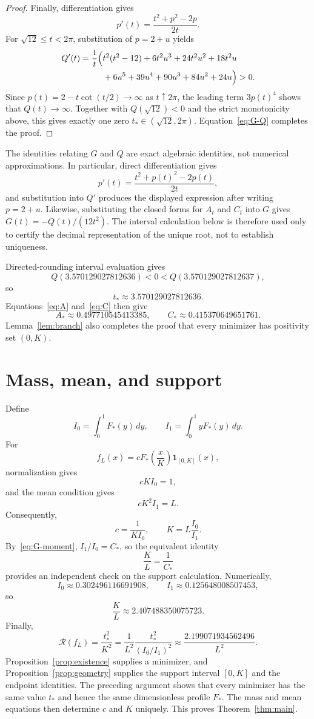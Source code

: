 \documentclass[11pt]{amsart}
\theoremstyle{definition}
\theoremstyle{remark}
\newcommand{\Rcal}{\mathcal R}
\begin{document}
\begin{proof}
Finally, differentiation gives
\[
 p'(t)=\frac{t^2+p^2-2p}{2t}.
\]
For $\sqrt{12}\leq t<2\pi$, substitution of $p=2+u$ yields
\[
 \begin{aligned}
 Q'(t)=\frac{1}{t}\Bigl(&t^2(t^2-12)+6t^2u^3+24t^2u^2+18t^2u\\
 &+6u^5+39u^4+90u^3+84u^2+24u\Bigr)>0.
 \end{aligned}
\]
Since $p(t)=2-t\cot(t/2)\to\infty$ as $t\uparrow2\pi$, the leading term
$3p(t)^4$ shows that $Q(t)\to\infty$. Together with
$Q(\sqrt{12})<0$ and the strict monotonicity above, this gives exactly one
zero $t_*\in(\sqrt{12},2\pi)$. Equation~\eqref{eq:G-Q} completes the proof.
\end{proof}

The identities relating $G$ and $Q$ are exact algebraic identities, not numerical approximations. In particular, direct differentiation gives
\[
 p'(t)=\frac{t^2+p(t)^2-2p(t)}{2t},
\]
and substitution into $Q'$ produces the displayed expression after writing $p=2+u$. Likewise, substituting the closed forms for $A_t$ and $C_t$ into $G$ gives $G(t)=-Q(t)/(12t^2)$. The interval calculation below is therefore used only to certify the decimal representation of the unique root, not to establish uniqueness.

Directed-rounding interval evaluation gives
\[
 Q(3.570129027812636)<0
 <Q(3.570129027812637),
\]
so
\[
 t_*\approx3.570129027812636.
\]
Equations~\eqref{eq:A} and~\eqref{eq:C} then give
\[
 A_*\approx0.497710545413385,
 \qquad
 C_*\approx0.415370649651761.
\]
Lemma~\ref{lem:branch} also completes the proof that every minimizer has positivity set $(0,K)$.

\section{Mass, mean, and support}
Define
\[
 I_0=\int_0^1F_*(y)\,dy,
 \qquad
 I_1=\int_0^1yF_*(y)\,dy.
\]
For
\[
 f_L(x)=cF_*\!\left(\frac{x}{K}\right)\mathbf1_{[0,K]}(x),
\]
normalization gives
\[
 cKI_0=1,
\]
and the mean condition gives
\[
 cK^2I_1=L.
\]
Consequently,
\[
 c=\frac{1}{KI_0},
 \qquad
 K=L\frac{I_0}{I_1}.
\]
By~\eqref{eq:G-moment}, $I_1/I_0=C_*$, so the equivalent identity
\begin{equation}\label{eq:support-C}
 \frac{K}{L}=\frac{1}{C_*}
\end{equation}
provides an independent check on the support calculation.
Numerically,
\[
 I_0\approx0.302496116691908,
 \qquad
 I_1\approx0.125648008507453,
\]
so
\[
 \frac{K}{L}\approx2.407488350075723.
\]
Finally,
\[
 \Rcal(f_L)=\frac{t_*^2}{K^2}
 =\frac{1}{L^2}\frac{t_*^2}{(I_0/I_1)^2}
 \approx\frac{2.199071934562496}{L^2}.
\]
Proposition~\ref{prop:existence} supplies a minimizer, and
Proposition~\ref{prop:geometry} supplies the support interval $[0,K]$ and the
endpoint identities. The preceding argument shows that every minimizer has the same value $t_*$ and hence the same dimensionless profile $F_*$. The mass and mean equations then determine $c$ and $K$ uniquely. This proves Theorem~\ref{thm:main}.
\end{document}
